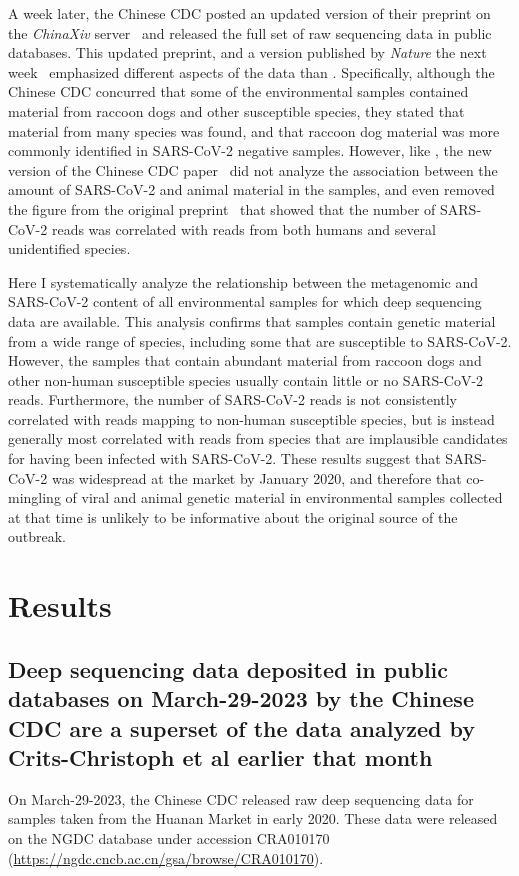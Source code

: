 \documentclass[9pt,twocolumn,twoside]{gsajnl_modified}
\begin{document}
A week later, the Chinese CDC posted an updated version of their preprint on the \textit{ChinaXiv} server~\citep{liu2023surveillance-chinaxiv} and released the full set of raw sequencing data in public databases.
This updated preprint, and a version published by \textit{Nature} the next week~\citep{liu2023surveillance} emphasized different aspects of the data than \citet{crits2023genetic}.
Specifically, although the Chinese CDC concurred that some of the environmental samples contained material from raccoon dogs and other susceptible species, they stated that material from many species was found, and that raccoon dog material was more commonly identified in SARS-CoV-2 negative samples.
However, like \citet{crits2023genetic}, the new version of the Chinese CDC paper~\citep{liu2023surveillance} did not analyze the association between the amount of SARS-CoV-2 and animal material in the samples, and even removed the figure from the original preprint~\citep{liu2022surveillance} that showed that the number of SARS-CoV-2 reads was correlated with reads from both humans and several unidentified species.

Here I systematically analyze the relationship between the metagenomic and SARS-CoV-2 content of all environmental samples for which deep sequencing data are available.
This analysis confirms that samples contain genetic material from a wide range of species, including some that are susceptible to SARS-CoV-2.
However, the samples that contain abundant material from raccoon dogs and other non-human susceptible species usually contain little or no SARS-CoV-2 reads.
Furthermore, the number of SARS-CoV-2 reads is not consistently correlated with reads mapping to non-human susceptible species, but is instead generally most correlated with reads from species that are implausible candidates for having been infected with SARS-CoV-2.
These results suggest that SARS-CoV-2 was widespread at the market by January 2020, and therefore that co-mingling of viral and animal genetic material in environmental samples collected at that time is unlikely to be informative about the original source of the outbreak.

\section{Results}

\subsection{Deep sequencing data deposited in public databases on March-29-2023 by the Chinese CDC are a superset of the data analyzed by Crits-Christoph et al earlier that month}
On March-29-2023, the Chinese CDC released raw deep sequencing data for samples taken from the Huanan Market in early 2020.
These data were released on the NGDC database under accession CRA010170 (\url{https://ngdc.cncb.ac.cn/gsa/browse/CRA010170}).
\end{document}
